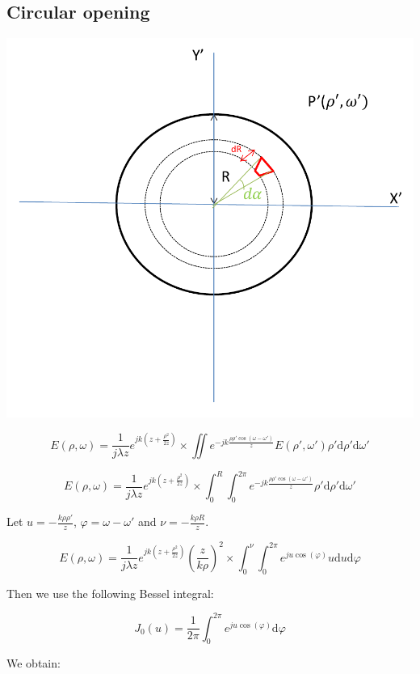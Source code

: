 \documentclass[10pt,a4paper]{article}
\begin{document}
	\subsection{Circular opening}
\begin{center}
\includegraphics[scale=0.3]{../Ressources/schema-4-2.png}
\end{center}

\[
E(\rho,\omega)=\frac{1}{j\lambda z} e^{jk\left(z+\frac{\rho^2}{2z}\right)}
\times \iint e^{-jk\frac{\rho\rho'\cos(\omega-\omega')}{z}}
E(\rho',\omega')\rho' \mathrm{d}\rho'\mathrm{d}\omega'
\]

\[
E(\rho,\omega)=\frac{1}{j\lambda z} e^{jk\left(z+\frac{\rho^2}{2z}\right)}
\times \int_0^R \int_0^{2\pi} e^{-jk\frac{\rho\rho'\cos(\omega-\omega')}{z}}
\rho' \mathrm{d}\rho'\mathrm{d}\omega'
\]

Let $u=-\frac{k\rho\rho'}{z}$, $\varphi=\omega-\omega'$ and $\nu=-\frac{k\rho R}{z}$.

\[
E(\rho,\omega)=\frac{1}{j\lambda z} e^{jk\left(z+\frac{\rho^2}{2z}\right)}
\left(\frac{z}{k\rho}\right)^2
\times \int_0^\nu \int_0^{2\pi} e^{ju\cos(\varphi)}
u \mathrm{d}u\mathrm{d}\varphi
\]

Then we use the following Bessel integral:

\[J_0(u)=\frac{1}{2\pi}\int_0^{2\pi} e^{ju\cos(\varphi)}\mathrm{d}\varphi\]

We obtain:
\end{document}
